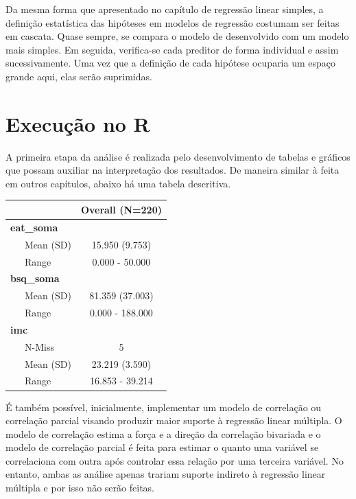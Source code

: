\documentclass[
]{book}
\newenvironment{Shaded}{\begin{snugshade}}{\end{snugshade}}
\newcommand{\KeywordTok}[1]{\textcolor[rgb]{0.13,0.29,0.53}{\textbf{#1}}}
\newcommand{\NormalTok}[1]{#1}
\newcommand{\OperatorTok}[1]{\textcolor[rgb]{0.81,0.36,0.00}{\textbf{#1}}}
\newcommand{\StringTok}[1]{\textcolor[rgb]{0.31,0.60,0.02}{#1}}
\begin{document}
Da mesma forma que apresentado no capítulo de regressão linear simples,
a definição estatística das hipóteses em modelos de regressão costumam
ser feitas em cascata. Quase sempre, se compara o modelo de desenvolvido
com um modelo mais simples. Em seguida, verifica-se cada preditor de
forma individual e assim sucessivamente. Uma vez que a definição de cada
hipótese ocuparia um espaço grande aqui, elas serão suprimidas.

\hypertarget{execuuxe7uxe3o-no-r-14}{%
\section{Execução no R}\label{execuuxe7uxe3o-no-r-14}}

A primeira etapa da análise é realizada pelo desenvolvimento de tabelas
e gráficos que possam auxiliar na interpretação dos resultados. De
maneira similar à feita em outros capítulos, abaixo há uma tabela
descritiva.

\begin{Shaded}
\end{Shaded}

\begin{longtable}[]{@{}lc@{}}
\toprule
& Overall (N=220)\tabularnewline
\midrule
\endhead
\textbf{eat\_soma} &\tabularnewline
~~~Mean (SD) & 15.950 (9.753)\tabularnewline
~~~Range & 0.000 - 50.000\tabularnewline
\textbf{bsq\_soma} &\tabularnewline
~~~Mean (SD) & 81.359 (37.003)\tabularnewline
~~~Range & 0.000 - 188.000\tabularnewline
\textbf{imc} &\tabularnewline
~~~N-Miss & 5\tabularnewline
~~~Mean (SD) & 23.219 (3.590)\tabularnewline
~~~Range & 16.853 - 39.214\tabularnewline
\bottomrule
\end{longtable}

É também possível, inicialmente, implementar um modelo de correlação ou
correlação parcial visando produzir maior suporte à regressão linear
múltipla. O modelo de correlação estima a força e a direção da
correlação bivariada e o modelo de correlação parcial é feita para
estimar o quanto uma variável se correlaciona com outra após controlar
essa relação por uma terceira variável. No entanto, ambas as análise
apenas trariam suporte indireto à regressão linear múltipla e por isso
não serão feitas.
\end{document}
